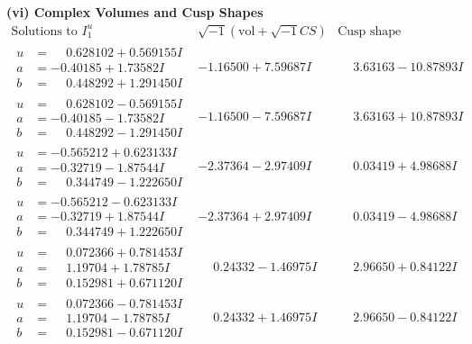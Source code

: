 \documentclass[1p]{elsarticle_modified}
\theoremstyle{definition}
\newcommand{\I}{\sqrt{-1}}
\begin{document}
\newpage\flushleft \textbf{(vi) Complex Volumes and Cusp Shapes}
$$\begin{array}{c|c|c}  
\text{Solutions to }I^u_{1}& \I (\text{vol} + \sqrt{-1}CS) & \text{Cusp shape}\\
 \hline 
\begin{aligned}
u &= \phantom{-}0.628102 + 0.569155 I \\
a &= -0.40185 + 1.73582 I \\
b &= \phantom{-}0.448292 + 1.291450 I\end{aligned}
 & -1.16500 + 7.59687 I & \phantom{-}3.63163 - 10.87893 I \\ \hline\begin{aligned}
u &= \phantom{-}0.628102 - 0.569155 I \\
a &= -0.40185 - 1.73582 I \\
b &= \phantom{-}0.448292 - 1.291450 I\end{aligned}
 & -1.16500 - 7.59687 I & \phantom{-}3.63163 + 10.87893 I \\ \hline\begin{aligned}
u &= -0.565212 + 0.623133 I \\
a &= -0.32719 - 1.87544 I \\
b &= \phantom{-}0.344749 - 1.222650 I\end{aligned}
 & -2.37364 - 2.97409 I & \phantom{-}0.03419 + 4.98688 I \\ \hline\begin{aligned}
u &= -0.565212 - 0.623133 I \\
a &= -0.32719 + 1.87544 I \\
b &= \phantom{-}0.344749 + 1.222650 I\end{aligned}
 & -2.37364 + 2.97409 I & \phantom{-}0.03419 - 4.98688 I \\ \hline\begin{aligned}
u &= \phantom{-}0.072366 + 0.781453 I \\
a &= \phantom{-}1.19704 + 1.78785 I \\
b &= \phantom{-}0.152981 + 0.671120 I\end{aligned}
 & \phantom{-}0.24332 - 1.46975 I & \phantom{-}2.96650 + 0.84122 I \\ \hline\begin{aligned}
u &= \phantom{-}0.072366 - 0.781453 I \\
a &= \phantom{-}1.19704 - 1.78785 I \\
b &= \phantom{-}0.152981 - 0.671120 I\end{aligned}
 & \phantom{-}0.24332 + 1.46975 I & \phantom{-}2.96650 - 0.84122 I \\ \hline\begin{aligned}

\end{aligned}
\end{array}$$
\end{document}
